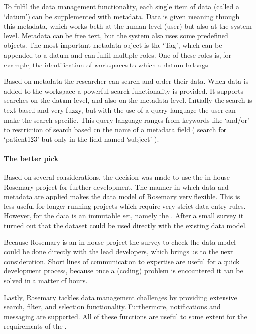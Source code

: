 To fulfil the data management functionality, each single item of data (called a `datum') can be supplemented with metadata.
Data is given meaning through this metadata, which works both at the  human level (user) but also at the  system level.
Metadata can be free text, but the system also uses some predefined objects.
The most important metadata object is the `Tag', which can be appended to a datum and can fulfil multiple roles. 
One of these roles is, for example, the identification of workspaces to which a datum belongs.

Based on metadata the researcher can search and order their data.
When data is added to the workspace a powerful search functionality is provided.
It supports searches on the datum level, and also on the metadata level.
Initially the search is text-based and very fuzzy, but with the use of a query language the user can make the search specific.
This query language ranges from keywords like `and/or' to restriction of search based on the name of a metadata field (\eg{} search for `patient123' but only in the field named `subject' ).

\paragraph{The better pick}
Based on several considerations, the decision was made to use the in-house Rosemary project for further development.
The manner in which data and metadata are applied makes  the data model of Rosemary very flexible.
This is less useful for longer running projects which require very strict data entry rules.
However, for the \ivfsystem{} data is an immutable set, namely the \projectdata{}.
After a small survey it turned out that the dataset could be used directly with the existing data model.

Because Rosemary is an in-house project the survey to check the data model could be done directly with the lead developers, which brings us to the next consideration.
Short lines of communication to expertise are useful for a quick development process, because once a (coding) problem is encountered it can be solved in a matter of hours.

Lastly, Rosemary tackles data management challenges by providing extensive search, filter, and selection functionality.
Furthermore, notifications and messaging are supported.
All of these functions are useful to some extent for the requirements of the \ivfsystem{}.